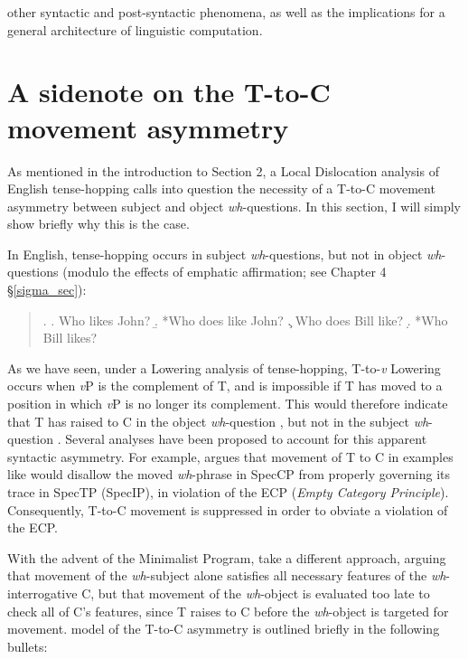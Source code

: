 other syntactic and post-syntactic phenomena, as well as the implications for a general architecture of linguistic computation.

\section{A sidenote on the T-to-C movement asymmetry}\label{T-to-C_sec}
As mentioned in the introduction to Section 2, a Local Dislocation analysis of English tense-hopping calls into question the necessity of a T-to-C movement asymmetry between subject and object {\it wh}-questions. In this section, I will simply show briefly why this is the case.

In English, tense-hopping occurs in subject {\it wh}-questions, but not in object {\it wh}-questions (modulo the effects of emphatic affirmation; see Chapter 4 \S\ref{sigma_sec}):

\singlespacing
\begin{quote}
\ex.
\a. Who likes John?
\b. *Who does like John?
\c. Who does Bill like?
\d. *Who Bill likes?

\end{quote}
\onehalfspacing

\noindent
As we have seen, under a Lowering analysis of tense-hopping, T-to-{\it v} Lowering occurs when {\it v}P is the complement of T, and is impossible if T has moved to a position in which {\it v}P is no longer its complement. This would therefore indicate that T has raised to C in the object {\it wh}-question \Last[c], but not in the subject {\it wh}-question \Last[a]. Several analyses have been proposed to account for this apparent syntactic asymmetry. For example, \citet{koopman1983} argues that movement of T to C in examples like \Last[b] would disallow the moved {\it wh}-phrase in SpecCP from properly governing its trace in SpecTP (SpecIP), in violation of the ECP ({\it Empty Category Principle}). Consequently, T-to-C movement is suppressed in order to obviate a violation of the ECP.

With the advent of the Minimalist Program, \citet{pesetsky_torrego2001} take a different approach, arguing that movement of the {\it wh}-subject alone satisfies all necessary features of the {\it wh}-interrogative C, but that movement of the {\it wh}-object is evaluated too late to check all of C's features, since T raises to C before the {\it wh}-object is targeted for movement.  model of the T-to-C asymmetry is outlined briefly in the following bullets:

